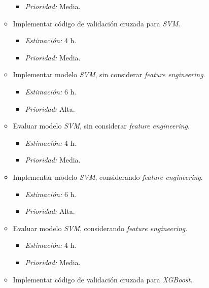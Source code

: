 \documentclass[
11pt, %
]{charter}
\begin{document}
\begin{itemize}
\begin{itemize}
\begin{itemize}
                    \item \textit{Prioridad:} Media.
                \end{itemize}
            \item Implementar código de validación cruzada para \textit{SVM}.
                \begin{itemize}
                    \item \textit{Estimación:} 4 h.
                    \item \textit{Prioridad:} Media.
                \end{itemize}
            \item Implementar modelo \textit{SVM}, sin considerar \textit{feature engineering}.
                \begin{itemize}
                    \item \textit{Estimación:} 6 h.
                    \item \textit{Prioridad:} Alta.
                \end{itemize}
            \item Evaluar modelo \textit{SVM}, sin considerar \textit{feature engineering}.
                \begin{itemize}
                    \item \textit{Estimación:} 4 h.
                    \item \textit{Prioridad:} Media.
                \end{itemize}
            \item Implementar modelo \textit{SVM}, considerando \textit{feature engineering}.
                \begin{itemize}
                    \item \textit{Estimación:} 6 h.
                    \item \textit{Prioridad:} Alta.
                \end{itemize}
            \item Evaluar modelo \textit{SVM}, considerando \textit{feature engineering}.
                \begin{itemize}
                    \item \textit{Estimación:} 4 h.
                    \item \textit{Prioridad:} Media.
                \end{itemize}
            \item Implementar código de validación cruzada para \textit{XGBoost}.
                \begin{itemize}

\end{itemize}
\end{itemize}
\end{itemize}
\end{document}
